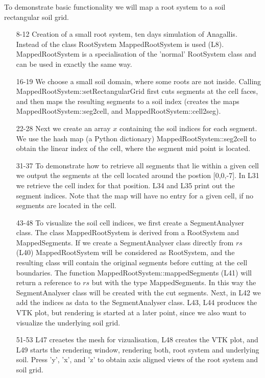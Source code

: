 To demonstrate basic functionality we will map a root system to a soil rectangular soil grid. 


\begin{itemize}

\item[8-12] Creation of a small root system, ten days simulation of Anagallis. Instead of the class RootSystem MappedRootSystem is used (L8). MappedRootSystem is a specialisation of the 'normal' RootSystem class and can be used in exactly the same way. 

\item[16-19] We choose a small soil domain, where some roots are not inside. Calling MappedRootSystem::setRectangularGrid first cuts segments at the cell faces, and then maps the resulting segments to a soil index (creates the maps MappedRootSystem::seg2cell, and MappedRootSystem::cell2seg).

\item[22-28] Next we create an array $x$ containing the soil indices for each segment. We use the hash map (a Python dictionary) MappedRootSystem::seg2cell to obtain the linear index of the cell, where the segment mid point is located.

\item[31-37] To demonstrate how to retrieve all segments that lie within a given cell we output the segments at the cell located around the postion [0,0,-7]. In L31 we retrieve the cell index for that position. L34 and L35 print out the segment indices. Note that the map will have no entry for a given cell, if no segments are located in the cell. 

\item[43-48] To visualize the soil cell indices, we first create a SegmentAnalyser class. The class MappedRootSystem is derived from a RootSystem and MappedSegments. If we create a SegmentAnalyser class directly from $rs$ (L40) MappedRootSystem will be considered as RootSystem, and the resulting class will contain the original segments before cutting at the cell boundaries. The function MappedRootSystem::mappedSegments (L41) will return a reference to $rs$ but with the type MappedSegments. In this way the SegmentAnalyser class will be created with the cut segments. Next, in L42 we add the indices as data to the SegmentAnalyser class. L43, L44 produces the VTK plot, but rendering is started at a later point, since we also want to visualize the underlying soil grid.

\item[51-53]  L47 creaetes the mesh for vizualisation, L48 creates the VTK plot, and L49 starts the rendering window, rendering both, root system and underlying soil. Press 'y', 'x', and 'z' to obtain axis aligned views of the root system and soil grid.

\end{itemize}

